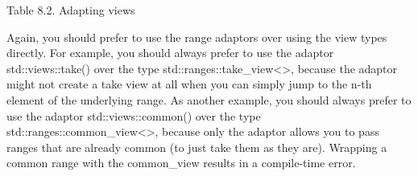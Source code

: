 \begin{center}
Table 8.2. Adapting views
\end{center}

Again, you should prefer to use the range adaptors over using the view types directly. For example, you should always prefer to use the adaptor std::views::take() over the type std::ranges::take\_view<>, because the adaptor might not create a take view at all when you can simply jump to the n-th element of the underlying range. As another example, you should always prefer to use the adaptor std::views::common() over the type std::ranges::common\_view<>, because only the adaptor allows you to pass ranges that are already common (to just take them as they are). Wrapping a common range with the common\_view results in a compile-time error.




